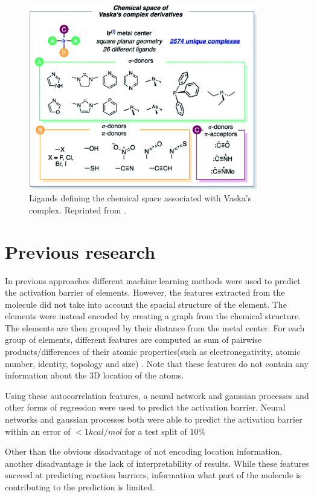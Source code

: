\begin{figure}
  \centering
  \includegraphics[width=10cm]{figures/introduction/chem-space.png}
  \caption{Ligands defining the chemical space associated with Vaska's complex. Reprinted from \cite{friederich_dos}.}
  \label{fig:chemspace}
\end{figure}
  

\section{Previous research}

In previous approaches different machine learning methods were used to predict the activation barrier of elements.
However, the features extracted from the molecule did not take into account the spacial structure of the element.
The elements were instead encoded by creating a graph from the chemical structure.
The elements are then grouped by their distance from the metal center.
For each group of elements, different features are computed as sum of pairwise products/differences of their atomic properties(such as electronegativity, atomic number, identity, topology and size) \cite{friederich_dos}.
Note that these features do not contain any information about the 3D location of the atoms.

Using these autocorrelation features, a neural network and gaussian processes and other forms of regression were used to predict the activation barrier.
Neural networks and gaussian processes both were able to predict the activation barrier within an error of $<1 kcal/mol$ for a test split of $10\%$

Other than the obvious disadvantage of not encoding location information, another disadvantage is the lack of interpretability of results.
While these features succeed at predicting reaction barriers, information what part of the molecule is contributing to the prediction is limited.

